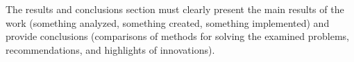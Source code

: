 The results and conclusions section must clearly present the main results of the work
(something analyzed, something created, something implemented) and provide
conclusions (comparisons of methods for solving the examined problems, recommendations,
and highlights of innovations).